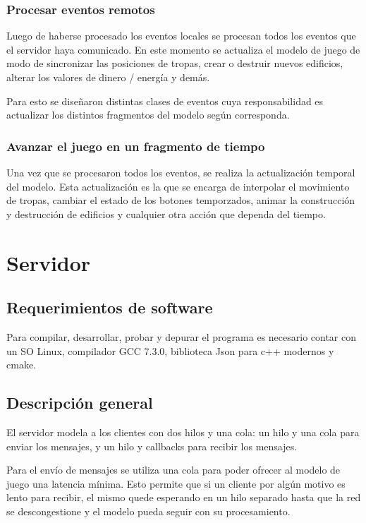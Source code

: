 \documentclass[titlepage,a4paper,12pt]{article}
\begin{document}
\subsubsection{Procesar eventos remotos}
Luego de haberse procesado los eventos locales se procesan todos los eventos que el servidor haya comunicado. En este momento se actualiza el modelo de juego de modo de sincronizar las posiciones de tropas, crear o destruir nuevos edificios, alterar los valores de dinero / energía y demás.

Para esto se diseñaron distintas clases de eventos cuya responsabilidad es actualizar los distintos fragmentos del modelo según corresponda.

\subsubsection{Avanzar el juego en un fragmento de tiempo}
Una vez que se procesaron todos los eventos, se realiza la actualización temporal del modelo. Esta actualización es la que se encarga de interpolar el movimiento de tropas, cambiar el estado de los botones temporzados, animar la construcción y destrucción de edificios y cualquier otra acción que dependa del tiempo.

\newpage
\section{Servidor}

\subsection{Requerimientos de software}
Para compilar, desarrollar, probar y depurar el programa es necesario contar con un SO Linux, compilador GCC 7.3.0, biblioteca Json para c++ modernos y cmake.

\subsection{Descripción general}
El servidor modela a los clientes con dos hilos y una cola: un hilo y una cola para enviar los mensajes, y un hilo y callbacks para recibir los mensajes. 

Para el envío de mensajes se utiliza una cola para poder ofrecer al modelo de juego una latencia mínima. Esto permite que si un cliente por algún motivo es lento para recibir, el mismo quede esperando en un hilo separado hasta que la red se descongestione y el modelo pueda seguir con su procesamiento. 
\end{document}
